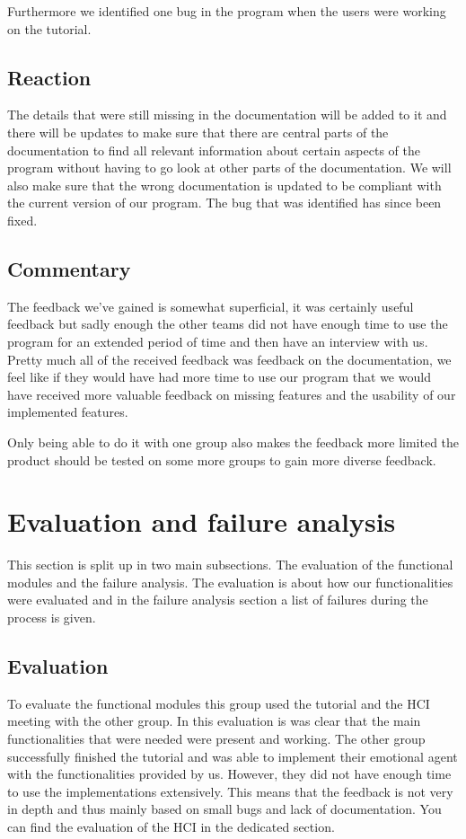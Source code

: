 \documentclass[11pt]{article}
\begin{document}
Furthermore we identified one bug in the program when the users were working on the tutorial. 
\subsection{Reaction}
The details that were still missing in the documentation will be added to it and there will be updates to make sure that there are central parts of the documentation to find all relevant information about certain aspects of the program without having to go look at other parts of the documentation. We will also make sure that the wrong documentation is updated to be compliant with the current version of our program. The bug that was identified has since been fixed.

\subsection{Commentary}
The feedback we've gained is somewhat superficial, it was certainly useful feedback but sadly enough the other teams did not have enough time to use the program for an extended period of time and then have an interview with us. Pretty much all of the received feedback was feedback on the documentation, we feel like if they would have had more time to use our program that we would have received more valuable feedback on missing features and the usability of our implemented features.

Only being able to do it with one group also makes the feedback more limited the product should be tested on some more groups to gain more diverse feedback.

\section{Evaluation and failure analysis}
This section is split up in two main subsections. The evaluation of the functional modules and the failure analysis. The evaluation is about how our functionalities were evaluated and in the failure analysis section a list of failures during the process is given.

\subsection{Evaluation}
To evaluate the functional modules this group used the tutorial and the HCI meeting with the other group. In this evaluation is was clear that the main functionalities that were needed were present and working. The other group successfully finished the tutorial and was able to implement their emotional agent with the functionalities provided by us. However, they did not have enough time to use the implementations extensively. This means that the feedback is not very in depth and thus mainly based on small bugs and lack of documentation. You can find the evaluation of the HCI in the dedicated section.
\end{document}

